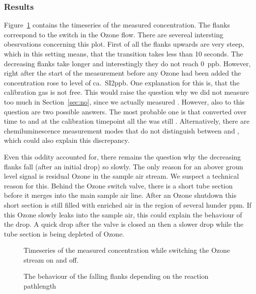 \subsubsection{Results}
\label{sec:switch-results}

Figure~\ref{fig:switch} contains the timeseries of the measured
 concentration. The flanks correspond to the switch in the
Ozone flow. There are severeal intersting obesrvations concerning this
plot. First of all the flanks upwards are very steep, which in this
setting means, that the transition takes less than 10 seconds. The
decreasing flanks take longer and interestingly they do not reach
\SI{0}{ppb}. However, right after the start of the measurement before
any Ozone had been added the concentration rose to level of ca.\
SI{2}{ppb}. One explanation for this is, that the calibration gas is
not \ch{NO2} free. This would raise the question why we did not
measure too much  in Section~\ref{sec:no}, since we actually
measured \ch{NO_x}. However, also to this question are two possible
answers. The most probable one is that  converted over time to
 and at the calibration timepoint all the  was still
. Alternatively, there are chemiluminescence measurement modes
that do not distinguish between \ch{NO} and \ch{NO2}, which could also
explain this discrepancy. 

Even this oddity accounted for, there remains the question why the
decreasing flanks fall (after an initial drop) so slowly. The only
reason for an abover groun level \ch{NO2} signal is residual Ozone in
the sample air stream. We suspect a technical reason for this. Behind
the Ozone switch valve, there is a short tube section before it merges
into the main sample air line. After an Ozone shutdown this short
section is still filled with \ch{O3} enriched air in the region of
several hunder \si{ppm}. If this Ozone slowly leaks into the sample
air, this could explain the behaviour of the drop. A quick drop after
the valve is closed an then a slower drop while the tube section is
being depleted of Ozone.

\begin{figure}[htbp]
  \centering
  
  \caption{Timeseries of the measured  concentration while
    switching the Ozone stream on and off.}
  \label{fig:switch}
\end{figure}

\begin{figure}[htbp]
  \centering
  
  \caption{The behaviour of the falling flanks depending on the
    reaction pathlength}
  \label{fig:switch-pl}
\end{figure}


